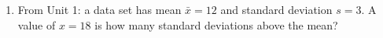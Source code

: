 \documentclass[10pt]{article}
\begin{document}
\begin{enumerate}
    \vspace{0.14in}

    \item From Unit 1: a data set has mean $\bar{x} = 12$ and standard deviation $s = 3$.
          A value of $x = 18$ is how many standard deviations above the mean?
          \quad \blank{4cm}

\end{enumerate}
\end{document}

